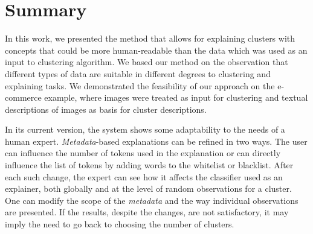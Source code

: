 \documentclass[
 twocolumn,
 hf,
]{ceurart}
\begin{document}
\section{Summary}
\label{sec:summary}
In this work, we presented the method that allows for explaining clusters with concepts that could be more human-readable than the data which was used as an input to clustering algorithm.
We based our method on the observation that different types of data are suitable in different degrees to clustering and explaining tasks.
We demonstrated the feasibility of our approach on the e-commerce example, where images were treated as input for clustering and textual descriptions of images as basis for cluster descriptions.

In its current version, the system shows some adaptability to the needs of a human expert.
\textit{Metadata}-based explanations can be refined in two ways.
The user can influence the number of tokens used in the explanation or can directly influence the list of tokens by adding words to the whitelist or blacklist.
After each such change, the expert can see how it affects the classifier used as an explainer, both globally and at the level of random observations for a cluster.
One can modify the scope of the \textit{metadata} and the way individual observations are presented.
If the results, despite the changes, are not satisfactory, it may imply the need to go back to choosing the number of clusters.

\end{document}
